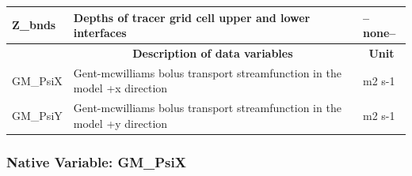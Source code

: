 \begin{longtable}{|m{}|m{}|m{}|}
Z\_bnds &Depths of tracer grid cell upper and lower interfaces &--none--  \\ \hline
\rowcolor{lightgray} \multicolumn{1}{|c|}{\textbf{Variables}} & \multicolumn{1}{|c|}{\textbf{Description of data variables}} &  \multicolumn{1}{|c|}{\textbf{Unit}}\\ \hline
GM\_PsiX &Gent-mcwilliams bolus transport streamfunction in the model +x direction &m2 s-1  \\ \hline
GM\_PsiY &Gent-mcwilliams bolus transport streamfunction in the model +y direction &m2 s-1  \\ \hline
\end{longtable}

\newp
\pagebreak
\subsubsection{Native Variable: GM\_PsiX}
